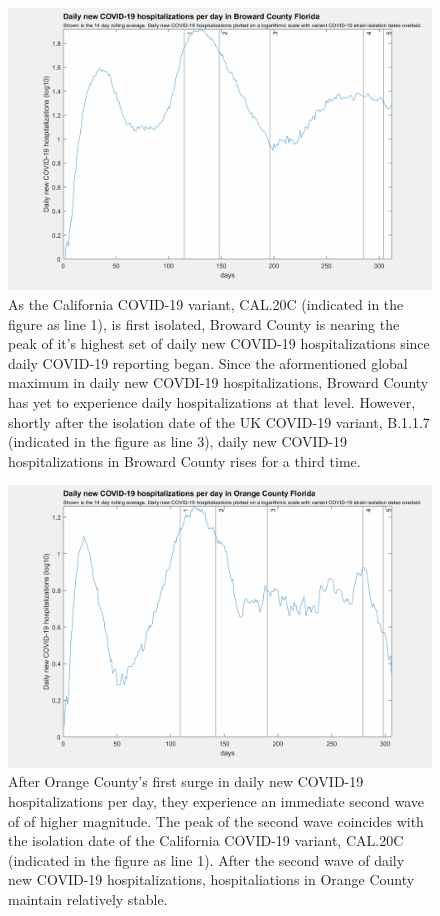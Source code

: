 \documentclass[]{article}
\begin{document}
\begin{figure}[!h]
	\includegraphics[width=\linewidth]{images/broward_hospitalizations_strains_log.png}
	\caption{As the California COVID-19 variant, CAL.20C (indicated in the figure as line 1), is first isolated, Broward County is nearing the peak of it's highest set of daily new COVID-19 hospitalizations since daily COVID-19 reporting began. Since the aformentioned global maximum in daily new COVDI-19 hospitalizations, Broward County has yet to experience daily hospitalizations at that level. However, shortly after the isolation date of the UK COVID-19 variant, B.1.1.7 (indicated in the figure as line 3), daily new COVID-19 hospitalizations in Broward County rises for a third time.  }
	\label{fig:images/broward_hospitalizations_strains_logLabel}
\end{figure}


\begin{figure}[!h]
	\includegraphics[width=\linewidth]{images/orange_hospitalizations_strains_log.png}
	\caption{After Orange County's first surge in daily new COVID-19 hospitalizations per day, they experience an immediate second wave of of higher magnitude. The peak of the second wave coincides with the isolation date of the California COVID-19 variant, CAL.20C (indicated in the figure as line 1). After the second wave of daily new COVID-19 hospitalizations, hospitaliations in Orange County maintain relatively stable.}
	\label{fig:images/orange_hospitalizations_strains_logLabel}
\end{figure}
\end{document}
